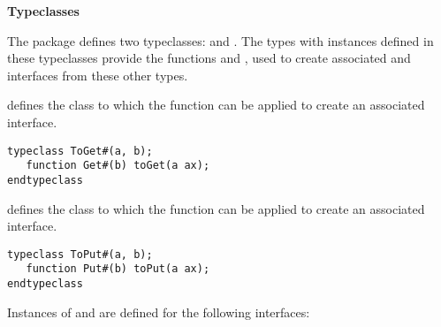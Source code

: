 {\bf Typeclasses}

The  package defines two typeclasses:  and
.   \label{toget}
The types with instances defined in these typeclasses 
provide the functions  and , used to create 
associated  and  interfaces from these other types.


 defines the class to which the function  can be
applied to create an associated  interface.


\begin{verbatim}
typeclass ToGet#(a, b);
   function Get#(b) toGet(a ax);
endtypeclass
\end{verbatim}

 defines the class to which the function  can be
applied to create an associated  interface.


\begin{verbatim}
typeclass ToPut#(a, b);
   function Put#(b) toPut(a ax);
endtypeclass
\end{verbatim}

Instances of  and  are defined for the following
interfaces:

